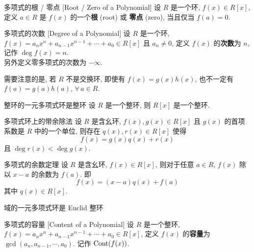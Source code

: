         \begin{dfn}
            {多项式的根 / 零点}
            [Root / Zero of a Polynomial]
            设 \(R\) 是一个环, \(f(x)\in R[x]\), 定义 \(a\in R\) 是 \(f(x)\) 的一个\textbf{根} (root) 或 \textbf{零点} (zero), 当且仅当 \(f(a)=0\).
        \end{dfn}

        \begin{dfn}
            {多项式的次数}
            [Degree of a Polynomial]
            设 \(R\) 是一个环, \(f(x)=a_n x^n + a_{n-1} x^{n-1} + \cdots + a_0\in R[x]\) 且 \(a_n\neq 0\), 定义 \(f(x)\) 的\textbf{次数}为 \(n\), 记作 \(\deg f(x)=n\). \\
            另外定义零多项式的次数为 \(-\infty\).
        \end{dfn}

        \begin{rmk}
            需要注意的是, 若 \(R\) 不是交换环, 即使有 \(f(x)=g(x)h(x)\), 也不一定有 \(f(a)=g(a)h(a)\), \(\forall\,a\in R\).
        \end{rmk}

        \begin{thm}
            {整环的一元多项式环是整环}
            设 \(R\) 是一个整环, 则 \(R[x]\) 是一个整环.
        \end{thm}

        \begin{thm}
            {多项式环上的带余除法}
            设 \(R\) 是含幺环, \(f(x), g(x)\in R[x]\) 且 \(g(x)\) 的首项系数是 \(R\) 中的一个单位, 则存在 \(q(x), r(x)\in R[x]\) 使得
            \[f(x)=g(x)q(x)+r(x)\]
            且 \(\deg r(x)<\deg g(x)\).
        \end{thm}

        \begin{thm}
            {多项式的余数定理}
            设 \(R\) 是含幺环, \(f(x)\in R[x]\), 则对于任意 \(a\in R\), \(f(x)\) 除以 \(x-a\) 的余数为 \(f(a)\). 即
            \[f(x)=(x-a)q(x)+f(a)\]
            其中 \(q(x)\in R[x]\).
        \end{thm}

        \begin{ppt}
            {域的一元多项式环是 Euclid 整环}
        \end{ppt}

        \begin{dfn}
            {多项式的容量}
            [Content of a Polynomial]
            设 \(R\) 是一个整环, \(f(x)=a_n x^n + a_{n-1} x^{n-1} + \cdots + a_0\in R[x]\), 定义 \(f(x)\) 的\textbf{容量}为 \(\gcd(a_n, a_{n-1}, \cdots, a_0)\). 记作 \(\operatorname{Cont}(f(x))\).
        \end{dfn}

